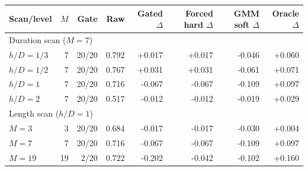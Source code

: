 \begin{tabular}{lrrrrrrr}
\toprule
Scan/level & $M$ & Gate & Raw & Gated $\Delta$ & Forced hard $\Delta$ & GMM soft $\Delta$ & Oracle $\Delta$ \\
\midrule
\multicolumn{8}{l}{Duration scan ($M=7$)} \\
$h/D=1/3$ & 7 & 20/20 & 0.792 & +0.017 & +0.017 & -0.046 & +0.060 \\
$h/D=1/2$ & 7 & 20/20 & 0.767 & +0.031 & +0.031 & -0.061 & +0.071 \\
$h/D=1$ & 7 & 20/20 & 0.716 & -0.067 & -0.067 & -0.109 & +0.097 \\
$h/D=2$ & 7 & 20/20 & 0.517 & -0.012 & -0.012 & -0.019 & +0.029 \\
\midrule
\multicolumn{8}{l}{Length scan ($h/D=1$)} \\
$M=3$ & 3 & 20/20 & 0.684 & -0.017 & -0.017 & -0.030 & +0.004 \\
$M=7$ & 7 & 20/20 & 0.716 & -0.067 & -0.067 & -0.109 & +0.097 \\
$M=19$ & 19 & 2/20 & 0.722 & -0.202 & -0.042 & -0.102 & +0.160 \\
\bottomrule
\end{tabular}
